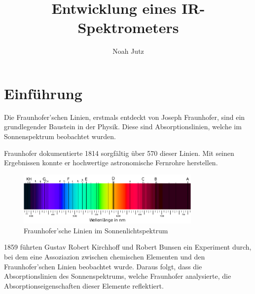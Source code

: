 \documentclass{article}
\title{Entwicklung eines IR-Spektrometers}
\author{Noah Jutz}
\date{}
\begin{document}
\maketitle
\tableofcontents

\newpage
\section{Einführung}



Die Fraunhofer'schen Linien, erstmals entdeckt von Joseph Fraunhofer, sind ein grundlegender Baustein in der Physik. Diese sind Absorptionslinien, welche im Sonnenspektrum beobachtet wurden.

Fraunhofer dokumentierte 1814 sorgfältig über 570 dieser Linien. Mit seinen Ergebnissen konnte er hochwertige astronomische Fernrohre herstellen.

\begin{figure}[H]
    \centering
    \includegraphics[width=0.8\textwidth]{fraunhofer_linien.png}
    \caption{Fraunhofer'sche Linien im Sonnenlichtspektrum}
\end{figure}

1859 führten Gustav Robert Kirchhoff und Robert Bunsen ein Experiment durch, bei dem eine Assoziazion zwischen chemischen Elementen und den Fraunhofer'schen Linien beobachtet wurde. Daraus folgt, dass die Absorptionslinien des Sonnenspektrums, welche Fraunhofer analysierte, die Absorptionseigenschaften dieser Elemente reflektiert.
\end{document}
